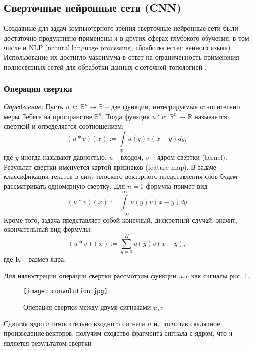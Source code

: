 \subsection{Сверточные нейронные сети (CNN)}
Созданные для задач компьютерного зрения сверточные нейронные сети
\cite{LeCun:1, LeCun:2, LeCun:3} были
достаточно продуктивно применены и в других сферах глубокого обучения,
в том числе и NLP (natural language processing, 
обработка естественного языка).
Использование их достигло максимума в ответ на
ограниченность применения полносвязных сетей для обработки данных с сеточной топологией \cite{Goodfellow}.
\subsubsection{Операция свертки}
\textit{Определение:} Пусть $u, v: \ \mathbb{R}^{n} \to \mathbb{R}$ -- две функции, интегрируемые относительно меры Лебега
    на пространстве $\mathbb{R}^{n}$. Тогда функция  $u * v: \ \mathbb{R}^n \to \mathbb{R}$ называется сверткой
    и определяется соотношением:
    \[(u * v) (x) := \int\limits_{\mathbb{R}^{n}} u(y)v(x-y)dy,\]
    где $y$ иногда называют давностью, $u$ -- входом, $v$ -- ядром свертки (kernel). Результат
свертки именуется картой признаков (feature map).
В задаче классификации текстов в силу плоского векторного представления слов будем рассматривать
одномерную свертку. Для $n = 1$ формула примет вид:
\[(u * v) (x) := \int\limits_{-\infty}^{\infty} u(y) v(x-y)dy\]
Кроме того, задача представляет собой конечный, дискретный случай, значит, окончательный вид формулы:
\[(u * v) (x) := \sum\limits_{y = 0}^{K} u (y) v(x-y),\]
где K -- размер ядра.

Для иллюстрации операции свертки рассмотрим функции $u, v$ как сигналы рис. \ref{fig:cnn1}.
\begin{figure}[ht]
    \centering
    \texttt{[image: convolution.jpg]}
    \caption{Операция свертки между двумя сигналами $u,v$}
    \label{fig:cnn1}
\end{figure}
Сдвигая ядро $v$ относительно входного сигнала $u$ и, посчитав скалярное произведение векторов, 
получим сходство фрагмента сигнала с ядром, что и является результатом свертки.
